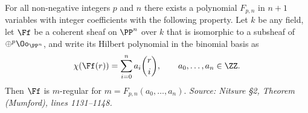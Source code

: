 \begin{theorem}
  \label{thm:mumford-regularity}
  For all non-negative integers $p$ and $n$ there exists a polynomial $F_{p,n}$
  in $n+1$ variables with integer coefficients with the following property. Let
  $k$ be any field, let $\Ff$ be a coherent sheaf on $\PP^n$ over $k$ that is
  isomorphic to a subsheaf of $\oplus^p\Oo_{\PP^n}$, and write its Hilbert
  polynomial in the binomial basis as
  \[
    \chi(\Ff(r)) = \sum_{i=0}^n a_i \binom{r}{i}, \qquad a_0,\dots,a_n\in\ZZ .
  \]
  Then $\Ff$ is $m$-regular for $m = F_{p,n}(a_0,\dots,a_n)$.
  \textit{Source: Nitsure \S2, Theorem (Mumford), lines 1131--1148.}
\end{theorem}

